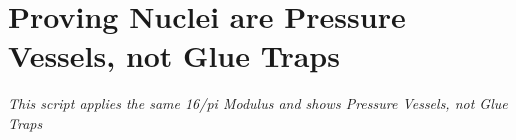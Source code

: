 \documentclass[11pt, letterpaper, openany]{book}
\begin{document}


\appendix
\chapter{Proving Nuclei are Pressure Vessels, not Glue Traps}
\label{app:Proving Nuclei are Pressure Vessels, not Glue Traps}
\textit{This script applies the same 16/pi Modulus and shows Pressure Vessels, not Glue Traps}
\end{document}
